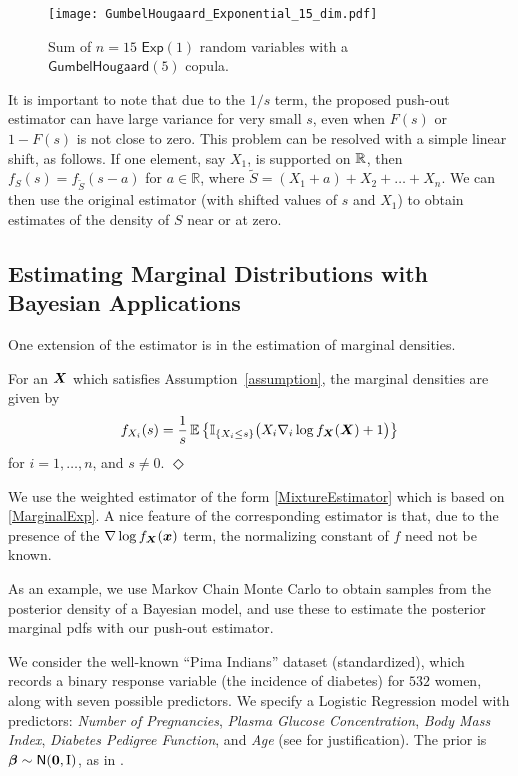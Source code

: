    \begin{figure}[H]
			\caption{Sum of $n=15$ $\mathsf{Exp}(1)$ random variables with a $\mathsf{GumbelHougaard}(5)$ copula.}\vspace{3mm}
    \centering
    \texttt{[image: GumbelHougaard\_Exponential\_15\_dim.pdf]}
    \end{figure}

It is important to note that due to the $1/s$ term, the proposed push-out estimator can have large variance for very small $s$, even when $F(s)$ or $1 - F(s)$ is not  close to zero. This problem can be resolved with a simple linear shift, as follows.  If one element, say $X_1$, is supported on $\mathbb{R}$, then $f_S(s) = f_{\widetilde{S}}(s-a)$ for $a \in \mathbb{R}$, where $\widetilde{S} = (X_1+a) + X_2 + \dots + X_n$.  We can then use the original estimator (with shifted values of $s$ and $X_1$) to obtain estimates of the  density of $S$ near or at zero.  



\subsection{Estimating Marginal Distributions with Bayesian Applications} \label{ssec:Marginals}
One  extension of the estimator is in the estimation of marginal densities.

\begin{proposition} \label{lemma:MarginalDensity}
    For an $\boldsymbol{X}$ which satisfies Assumption~\ref{assumption}, the marginal densities are given by
    \begin{equation} \label{MarginalExp}
    f_{X_i}(s) = \frac1s \operatorname{{\mathbb E}} \big\{ \mathbb{I}_{\{ X_i \le s \}}  \big(X_i \nabla_i \log f_{\boldsymbol{X}}(\boldsymbol{X}) + 1 \big)  \big\}
    \end{equation}
    for $i=1,\dots,n$, and $s \not=0$. \hfill $\Diamond$
    \end{proposition}
We use the weighted estimator of the form \eqref{MixtureEstimator} which is based on \eqref{MarginalExp}. A nice feature of the corresponding estimator is that, due to the presence of the $\nabla \log f_{\boldsymbol{X}}(\boldsymbol{x})$ term,  the normalizing constant of $f$ need not be known. 



As an example, we use Markov Chain Monte Carlo to obtain samples from the posterior density of a Bayesian model, and use these to estimate the posterior marginal pdfs with our push-out estimator.

 We consider the well-known ``Pima Indians'' dataset (standardized), which records a binary response variable  (the incidence of diabetes) for $532$ women, along with seven possible predictors. We specify a Logistic Regression model with predictors: {\em Number of Pregnancies}, {\em Plasma Glucose Concentration}, {\em Body Mass Index}, {\em Diabetes Pedigree Function}, and {\em Age} (see \cite{Friel2012} for justification). The prior is $\boldsymbol{\beta} \sim {\sf N}(\boldsymbol{0}, \mathrm{I})$, as in \cite{Friel2012}. 

